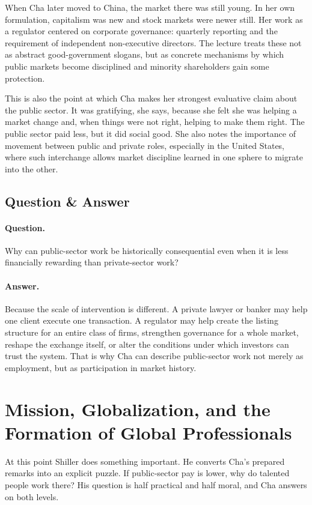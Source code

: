 When Cha later moved to China, the market there was still young. In her own formulation, capitalism was new and stock markets were newer still. Her work as a regulator centered on corporate governance: quarterly reporting and the requirement of independent non-executive directors. The lecture treats these not as abstract good-government slogans, but as concrete mechanisms by which public markets become disciplined and minority shareholders gain some protection.

This is also the point at which Cha makes her strongest evaluative claim about the public sector. It was gratifying, she says, because she felt she was helping a market change and, when things were not right, helping to make them right. The public sector paid less, but it did social good. She also notes the importance of movement between public and private roles, especially in the United States, where such interchange allows market discipline learned in one sphere to migrate into the other.

\subsection{Question \& Answer}

\paragraph{Question.} Why can public-sector work be historically consequential even when it is less financially rewarding than private-sector work?

\paragraph{Answer.} Because the scale of intervention is different. A private lawyer or banker may help one client execute one transaction. A regulator may help create the listing structure for an entire class of firms, strengthen governance for a whole market, reshape the exchange itself, or alter the conditions under which investors can trust the system. That is why Cha can describe public-sector work not merely as employment, but as participation in market history.

\section{Mission, Globalization, and the Formation of Global Professionals}

At this point Shiller does something important. He converts Cha's prepared remarks into an explicit puzzle. If public-sector pay is lower, why do talented people work there? His question is half practical and half moral, and Cha answers on both levels.

